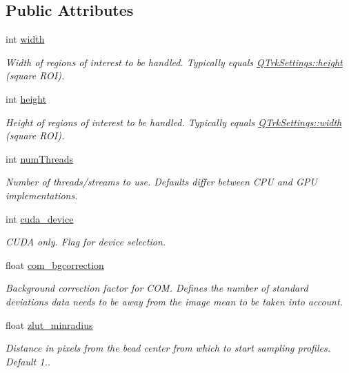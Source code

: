 \subsection*{Public Attributes}
\begin{DoxyCompactItemize}
\item 
int \hyperlink{struct_q_trk_settings_aef24eb3a4692bd67ff1aca8ef950e08d}{width}
\begin{DoxyCompactList}\small\item\em Width of regions of interest to be handled. Typically equals \hyperlink{struct_q_trk_settings_a94c965d103e7a0a4f1fced8eee1324ce}{Q\+Trk\+Settings\+::height} (square R\+OI). \end{DoxyCompactList}\item 
int \hyperlink{struct_q_trk_settings_a94c965d103e7a0a4f1fced8eee1324ce}{height}
\begin{DoxyCompactList}\small\item\em Height of regions of interest to be handled. Typically equals \hyperlink{struct_q_trk_settings_aef24eb3a4692bd67ff1aca8ef950e08d}{Q\+Trk\+Settings\+::width} (square R\+OI). \end{DoxyCompactList}\item 
int \hyperlink{struct_q_trk_settings_a8c6f1c671b527155afd5dad894c152da}{num\+Threads}
\begin{DoxyCompactList}\small\item\em Number of threads/streams to use. Defaults differ between C\+PU and G\+PU implementations. \end{DoxyCompactList}\item 
int \hyperlink{struct_q_trk_settings_a795682a80b672b594ebd225aebf3fb16}{cuda\+\_\+device}
\begin{DoxyCompactList}\small\item\em C\+U\+DA only. Flag for device selection. \end{DoxyCompactList}\item 
float \hyperlink{struct_q_trk_settings_a18ce353ffb049d1c86254a773a6fe49d}{com\+\_\+bgcorrection}
\begin{DoxyCompactList}\small\item\em Background correction factor for C\+OM. Defines the number of standard deviations data needs to be away from the image mean to be taken into account. \end{DoxyCompactList}\item 
float \hyperlink{struct_q_trk_settings_a1a14537a9e784c65eed512e72ee86c02}{zlut\+\_\+minradius}
\begin{DoxyCompactList}\small\item\em Distance in pixels from the bead center from which to start sampling profiles. Default 1.. \end{DoxyCompactList}\item 

\end{DoxyCompactItemize}
